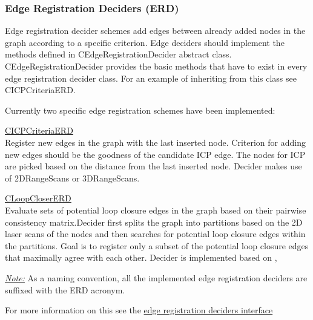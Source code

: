 \subsubsection{Edge Registration Deciders (ERD)}

Edge registration decider schemes add edges between already added nodes in the
graph according to a specific criterion. Edge deciders should implement the
methods defined in CEdgeRegistrationDecider abstract class.
CEdgeRegistrationDecider provides the basic methods that have to exist in every
edge registration decider class. For an example of inheriting from this class
see CICPCriteriaERD.

Currently two specific edge registration schemes have been implemented:

\begin{itemize*}
    \item \href{http://reference.mrpt.org/devel/structmrpt_1_1graphslam_1_1deciders_1_1_c_i_c_p_criteria_e_r_d_1_1_t_params.html}{CICPCriteriaERD} \hfill\\
		Register new edges in the graph with the last inserted node. Criterion for
		adding new edges should be the goodness of the
		candidate ICP edge. The nodes for ICP are picked based on the distance from the
		last inserted node. Decider makes use of 2DRangeScans or 3DRangeScans.

    \item \href{http://reference.mrpt.org/devel/classmrpt_1_1graphslam_1_1deciders_1_1_c_loop_closer_e_r_d.html}{CLoopCloserERD}\hfill\\
		Evaluate sets of potential loop closure edges in the graph based on their
		pairwise consistency matrix.Decider first splits the graph into partitions
		based on the 2D laser scans of the nodes and then searches for potential loop
		closure edges within the partitions. Goal is to register only a subset of the
		potential loop closure edges that maximally agree with each other. Decider is
		implemented based on \cite{Blanco2006}, \cite{Olson2009}

\end{itemize*}

\ul{\textit{Note:}} As a naming convention, all the implemented edge
registration deciders are suffixed with the ERD acronym.

For more information on this see the
\href{http://reference.mrpt.org/devel/classmrpt_1_1graphslam_1_1deciders_1_1_c_edge_registration_decider.html}{edge
registration deciders interface}

